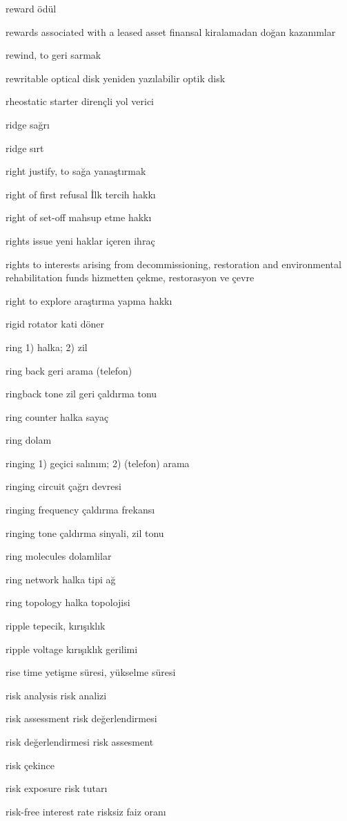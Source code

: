 \documentclass[12pt,fleqn]{article}\usepackage{../../common}
\begin{document}
reward ödül

rewards associated with a leased asset finansal kiralamadan doğan kazanımlar

rewind, to geri sarmak

rewritable optical disk yeniden yazılabilir optik disk

rheostatic starter dirençli yol verici

ridge sağrı

ridge sırt

right justify, to sağa yanaştırmak

right of first refusal İlk tercih hakkı

right of set-off mahsup etme hakkı

rights issue yeni haklar içeren ihraç

rights to interests arising from decommissioning, restoration and environmental rehabilitation funds hizmetten çekme, restorasyon ve çevre

right to explore araştırma yapma hakkı

rigid rotator kati döner

ring 1) halka; 2) zil

ring back geri arama (telefon)

ringback tone zil geri çaldırma tonu

ring counter halka sayaç

ring dolam

ringing 1) geçici salınım; 2) (telefon) arama

ringing circuit çağrı devresi

ringing frequency çaldırma frekansı

ringing tone çaldırma sinyali, zil tonu

ring molecules dolamlilar

ring network halka tipi ağ

ring topology halka topolojisi

ripple tepecik, kırışıklık

ripple voltage kırışıklık gerilimi

rise time yetişme süresi, yükselme süresi

risk analysis risk analizi

risk assessment risk değerlendirmesi

risk değerlendirmesi risk assesment

risk çekince

risk exposure risk tutarı

risk-free interest rate risksiz faiz oranı
\end{document}
